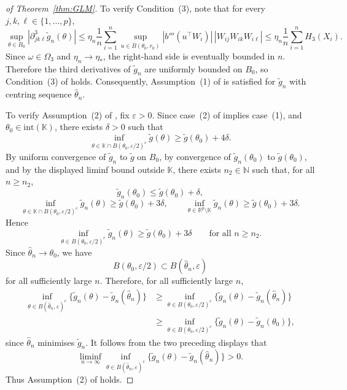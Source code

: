 \documentclass[11pt]{article}
\theoremstyle{plain}
\theoremstyle{definition}
\theoremstyle{remark}
\begin{document}
\begin{proof}[of Theorem~\ref{thm:GLM}]
To verify Condition~(3), note that for every $j,k,\ell\in\{1,\ldots,p\}$,
\[
\sup_{\theta\in B_0}\left|\partial_{jk\ell}^{3}\tilde{g}_{n}(\theta)\right|\le\eta_{n}\frac{1}{n}\sum_{i=1}^{n}\sup_{u\in\overline{B}(\theta_{0},r_{0})}|b'''(u^{\top}W_{i})|\,|W_{ij}W_{ik}W_{i\ell}|\le\eta_{n}\frac{1}{n}\sum_{i=1}^{n}H_{3}(X_{i}).
\]
Since $\omega\in\Omega_{3}$ and $\eta_{n}\to\eta_{*}$, the right-hand
side is eventually bounded in $n$. Therefore the third derivatives
of $\tilde{g}_{n}$ are uniformly bounded on $B_0$, so
Condition~(3) of \citet[Thm.~6]{miller2021generalized_posteriors}
holds. Consequently, Assumption~(1) of \citet[Thm.~4]{miller2021generalized_posteriors}
is satisfied for $\tilde{g}_{n}$ with centring sequence $\hat{\theta}_{n}$.

To verify Assumption~(2) of \citet[Thm.~4]{miller2021generalized_posteriors},
fix $\varepsilon>0$. Since case~(2) of \citet[Thm.~5]{miller2021generalized_posteriors}
implies case~(1), and $\theta_{0}\in\mathrm{int}(\mathbb{K})$, there
exists $\delta>0$ such that
\[
\inf_{\theta\in\mathbb{K}\cap B(\theta_{0},\varepsilon/2)^{c}}\tilde{g}(\theta)\ge\tilde{g}(\theta_{0})+4\delta.
\]
By uniform convergence of $\tilde{g}_{n}$ to $\tilde{g}$ on $B_0$,
by convergence of $\tilde{g}_{n}(\theta_{0})$ to $\tilde{g}(\theta_{0})$,
and by the displayed liminf bound outside $\mathbb{K}$, there exists
$n_{2}\in\mathbb{N}$ such that, for all $n\ge n_{2}$,
\[
\tilde{g}_{n}(\theta_{0})\le\tilde{g}(\theta_{0})+\delta,
\]
\[
\inf_{\theta\in\mathbb{K}\cap B(\theta_{0},\varepsilon/2)^{c}}\tilde{g}_{n}(\theta)\ge\tilde{g}(\theta_{0})+3\delta,\qquad\inf_{\theta\in\mathbb{R}^{p}\setminus\mathbb{K}}\tilde{g}_{n}(\theta)\ge\tilde{g}(\theta_{0})+3\delta.
\]
Hence
\[
\inf_{\theta\in B(\theta_{0},\varepsilon/2)^{c}}\tilde{g}_{n}(\theta)\ge\tilde{g}(\theta_{0})+3\delta\qquad\text{for all }n\ge n_{2}.
\]
Since $\hat{\theta}_{n}\to\theta_{0}$, we have
\[
B(\theta_{0},\varepsilon/2)\subset B(\hat{\theta}_{n},\varepsilon)
\]
for all sufficiently large $n$. Therefore, for all sufficiently large
$n$,
\begin{align*}
\inf_{\theta\in B(\hat{\theta}_{n},\varepsilon)^{c}}\{\tilde{g}_{n}(\theta)-\tilde{g}_{n}(\hat{\theta}_{n})\} & \ge\inf_{\theta\in B(\theta_{0},\varepsilon/2)^{c}}\{\tilde{g}_{n}(\theta)-\tilde{g}_{n}(\hat{\theta}_{n})\}\\
 & \ge\inf_{\theta\in B(\theta_{0},\varepsilon/2)^{c}}\{\tilde{g}_{n}(\theta)-\tilde{g}_{n}(\theta_{0})\},
\end{align*}
since $\hat{\theta}_{n}$ minimises $\tilde{g}_{n}$. It follows from
the two preceding displays that
\[
\liminf_{n\to\infty}\inf_{\theta\in B(\hat{\theta}_{n},\varepsilon)^{c}}\{\tilde{g}_{n}(\theta)-\tilde{g}_{n}(\hat{\theta}_{n})\}>0.
\]
Thus Assumption~(2) of \citet[Thm.~4]{miller2021generalized_posteriors}
holds.


\end{proof}
\end{document}
